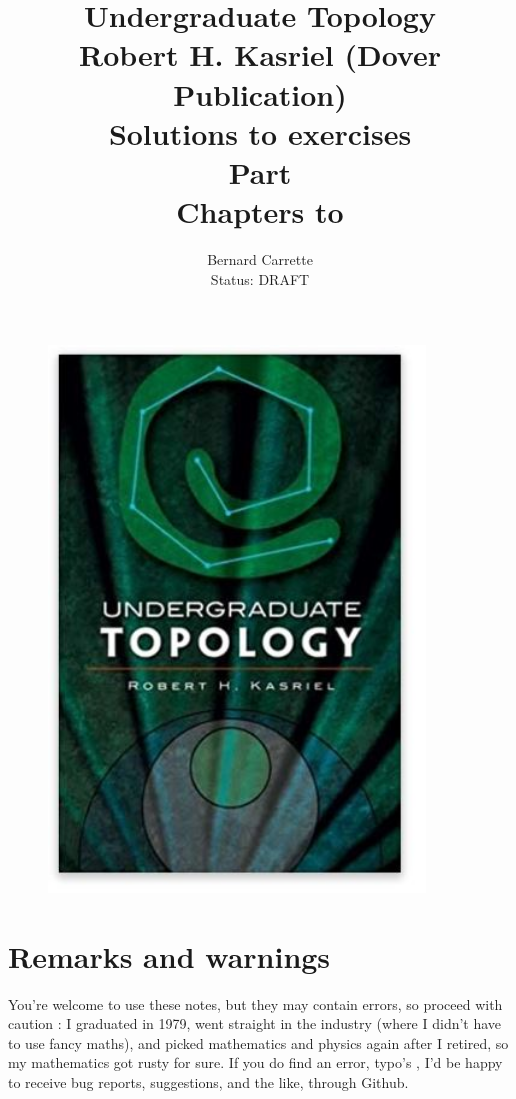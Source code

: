 \documentclass{thesis}
\author{Bernard Carrette\\
Status: DRAFT}
\title{Undergraduate Topology\\Robert H. Kasriel (Dover Publication)\\ Solutions to exercises\\Part \RomanNumeralCaps{1}\\
Chapters \RomanNumeralCaps{1} to \RomanNumeralCaps{4}}
\begin{document}
\maketitle
\begin{figure}%
  \centering
  \includegraphics[width=10cm]{./images/zebook.jpg}
  \caption{}
  \label{fig:test}
\end{figure}

\section*{Remarks and warnings}
You're welcome to use these notes, but they may contain errors, so proceed with caution : I graduated in 1979, went straight in the industry (where I didn't have to use fancy maths), and picked mathematics and physics again after I retired, so my mathematics got rusty  for sure. If you do find an error, typo's , I'd be happy to receive bug reports, suggestions, and the like, through Github.
\newpage

\tableofcontents
\listoffigures




\printbibliography %
\end{document}
